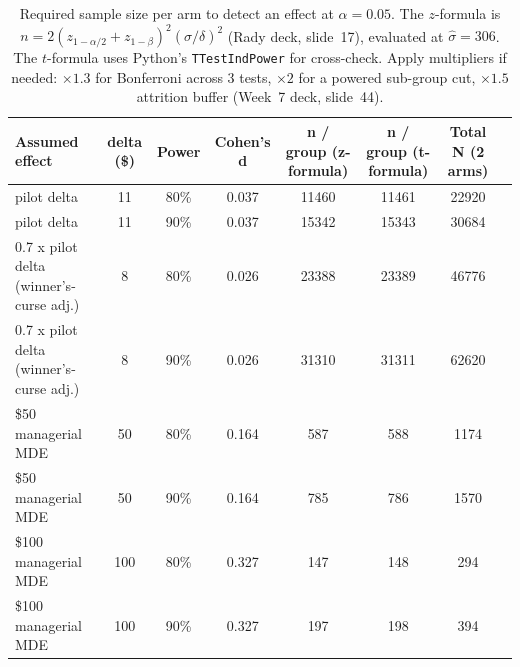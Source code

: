 \begin{table}[!htbp]
  \centering
  \begin{threeparttable}
  \caption{Required sample size per arm to detect an effect at $\alpha=0.05$. The $z$-formula is $n = 2(z_{1-\alpha/2}+z_{1-\beta})^2(\hat\sigma/\delta)^2$ (Rady deck, slide~17), evaluated at $\hat\sigma=306$. The $t$-formula uses Python's \texttt{TTestIndPower} for cross-check. Apply multipliers if needed: $\times 1.3$ for Bonferroni across 3 tests, $\times 2$ for a powered sub-group cut, $\times 1.5$ attrition buffer (Week~7 deck, slide~44).}
  \label{tab:rollout}
  \begin{tabular}{lccccccc}
\toprule
Assumed effect & delta (\$) & Power & Cohen's d & n / group (z-formula) & n / group (t-formula) & Total N (2 arms) \\
\midrule
pilot delta & 11 & 80\% & 0.037 & 11460 & 11461 & 22920 \\
pilot delta & 11 & 90\% & 0.037 & 15342 & 15343 & 30684 \\
0.7 x pilot delta (winner's-curse adj.) & 8 & 80\% & 0.026 & 23388 & 23389 & 46776 \\
0.7 x pilot delta (winner's-curse adj.) & 8 & 90\% & 0.026 & 31310 & 31311 & 62620 \\
\$50 managerial MDE & 50 & 80\% & 0.164 & 587 & 588 & 1174 \\
\$50 managerial MDE & 50 & 90\% & 0.164 & 785 & 786 & 1570 \\
\$100 managerial MDE & 100 & 80\% & 0.327 & 147 & 148 & 294 \\
\$100 managerial MDE & 100 & 90\% & 0.327 & 197 & 198 & 394 \\
\bottomrule
\end{tabular}
  \end{threeparttable}
\end{table}
